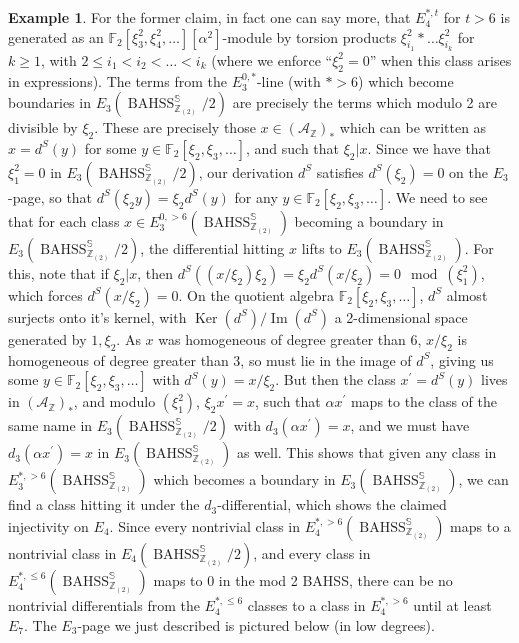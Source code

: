 \documentclass[11pt,leqno]{article}
\newcommand{\zz}{\mathbb{Z}}
\newcommand{\sss}{\mathbb{S}}
\newcommand{\mc}[1]{\mathcal{#1}}
\newcommand{\fff}{\mathbb{F}}
\newcommand{\mo}[1]{\operatorname{#1}}
\newtheorem*{short hand}{theorem name}
\theoremstyle{plain}  %
\theoremstyle{definition}
\newtheorem{example}{Example}[section]
\numberwithin{equation}{section}
\begin{document}
\begin{example}
For the former claim, in fact one can say more, that $E_4^{*,t}$ for $t>6$ is generated as an $\fff_2[\xi_3^2,\xi_4^2,\ldots][\alpha^2]$-module by torsion products $\xi_{i_1}^2*\ldots \xi_{i_k}^2$ for $k\geq 1$, with $2\leq i_1<i_2<\ldots <i_k$ (where we enforce ``$\xi_2^2=0$'' when this class arises in expressions).  The terms from the $E_3^{0,*}$-line (with $*>6$) which become boundaries in $E_3(\mo{BAHSS}_{\zz_{(2)}}^{\sss}/2)$ are precisely the terms which modulo 2 are divisible by $\xi_2$.  These are precisely those $x\in (\mc{A}_{\zz})_*$ which can be written as $x=d^S(y)$ for some $y\in \fff_2[\xi_2,\xi_3,\ldots]$, and such that $\xi_2|x$.  Since we have that $\xi_1^2=0$ in $E_3(\mo{BAHSS}_{\zz_{(2)}}^{\sss}/2)$, our derivation $d^S$ satisfies $d^S(\xi_2)=0$ on the $E_3$-page, so that $d^S(\xi_2 y)=\xi_2d^S(y)$ for any $y\in \fff_2[\xi_2,\xi_3,\ldots]$.  We need to see that for each class $x\in E_3^{0,>6}(\mo{BAHSS}_{\zz_{(2)}}^{\sss})$ becoming a boundary in $E_3(\mo{BAHSS}_{\zz_{(2)}}^{\sss}/2)$, the differential hitting $x$ lifts to $E_3(\mo{BAHSS}_{\zz_{(2)}}^{\sss})$.  For this, note that if $\xi_2|x$, then $d^S((x/\xi_2)\xi_2)=\xi_2d^S(x/\xi_2)=0\mod(\xi_1^2)$, which forces $d^S(x/\xi_2)=0$.  On the quotient algebra $\fff_2[\xi_2,\xi_3,\ldots]$, $d^S$ almost surjects onto it's kernel, with $\mo{Ker}(d^S)/\mo{Im}(d^S)$ a 2-dimensional space generated by $1, \xi_2$.  As $x$ was homogeneous of degree greater than $6$, $x/\xi_2$ is homogeneous of degree greater than $3$, so must lie in the image of $d^S$, giving us some $y\in \fff_2[\xi_2,\xi_3,\ldots]$ with $d^S(y)=x/\xi_2$.  But then the class $x^{\prime}=d^S(y)$ lives in $(\mc{A}_{\zz})_*$, and modulo $(\xi_1^2)$, $\xi_2x^{\prime}=x$, such that $\alpha x^{\prime}$ maps to the class of the same name in $E_3(\mo{BAHSS}_{\zz_{(2)}}^{\sss}/2)$ with $d_3(\alpha x^{\prime})=x$, and we must have $d_3(\alpha x^{\prime})=x$ in $E_3(\mo{BAHSS}_{\zz_{(2)}}^{\sss})$ as well.  This shows that given any class in $E_3^{*,>6}(\mo{BAHSS}_{\zz_{(2)}}^{\sss})$ which becomes a boundary in $E_3(\mo{BAHSS}_{\zz_{(2)}}^{\sss})$, we can find a class hitting it under the $d_3$-differential, which shows the claimed injectivity on $E_4$.  Since every nontrivial class in $E_{4}^{*,>6}(\mo{BAHSS}_{\zz_{(2)}}^{\sss})$ maps to a nontrivial class in $E_4(\mo{BAHSS}_{\zz_{(2)}}^{\sss}/2)$, and every class in $E_4^{*,\leq 6}(\mo{BAHSS}_{\zz_{(2)}}^{\sss})$ maps to 0 in the mod 2 BAHSS, there can be no nontrivial differentials from the $E_4^{*,\leq 6}$ classes to a class in $E_4^{*,>6}$ until at least $E_7$.  The $E_3$-page we just described is pictured below (in low degrees).

\end{example}
\end{document}

